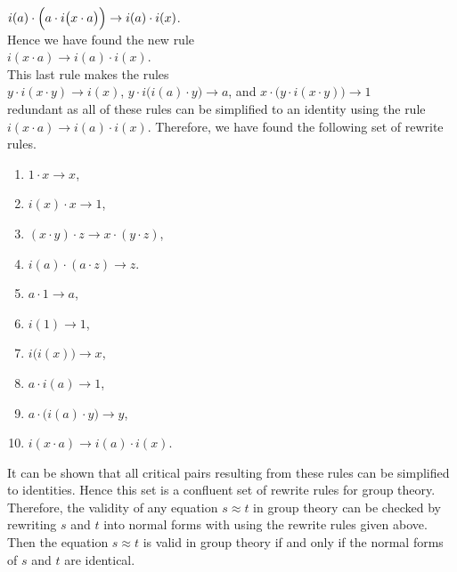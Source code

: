 $i(a) \cdot \Bigl(a \cdot i\bigl(x \cdot a\bigr)\Bigr) \rightarrow i(a) \cdot i(x)$.
\\[0.2cm]
Hence we have found the new rule
\\[0.2cm]
\hspace*{1.3cm}
$i(x \cdot a) \rightarrow i(a) \cdot i(x)$.
\\[0.2cm]
This last rule makes the rules
\\[0.2cm]
\hspace*{1.3cm}
$y \cdot i(x \cdot y) \rightarrow i(x)$, \quad
$y \cdot i\bigl(i(a)\cdot y\bigr) \rightarrow a$, \quad and \quad
$x \cdot \bigl(y \cdot i(x \cdot y)\bigr) \rightarrow 1$
\\[0.2cm]
redundant as all of these rules can be simplified to an identity using the rule $i(x \cdot a) \rightarrow i(a) \cdot i(x)$.
Therefore, we have found the following set of rewrite rules.
\begin{enumerate}
\item $1 \cdot x \rightarrow x$,
\item $i(x) \cdot x \rightarrow 1$, 
\item $(x \cdot y) \cdot z \rightarrow x \cdot (y \cdot z)$,
\item $i(a) \cdot (a \cdot z) \rightarrow z$.
\item $a \cdot 1 \rightarrow a$,
\item $i(1) \rightarrow 1$,
\item $i\bigl(i(x)\bigr) \rightarrow x$,
\item $a \cdot i(a) \rightarrow 1$,
\item $a \cdot \bigl(i(a) \cdot y\bigr) \rightarrow y$,
\item $i(x \cdot a) \rightarrow i(a) \cdot i(x)$.
\end{enumerate}
It can be shown that all critical pairs resulting from these rules can be simplified to identities.  Hence this
set is a confluent set of rewrite rules for group theory.  Therefore, the validity of any equation $s \approx
t$ in group theory can be checked by rewriting $s$ and $t$ into normal forms with using the rewrite rules given
above.  Then the equation $s \approx t$ is valid in group theory if and only if the normal forms of $s$ and $t$
are identical. 
\eoxs

